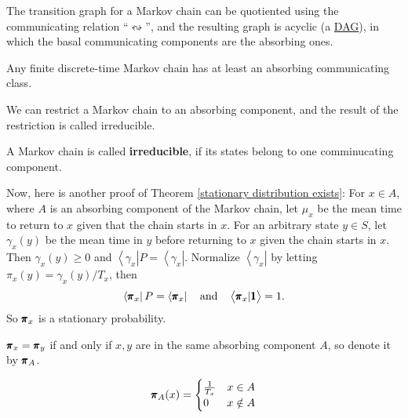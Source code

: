 \begin{remark}
    The transition graph for a Markov chain can be quotiented using the communicating relation ``$\leftrightsquigarrow$'', and the resulting graph is acyclic (a \href{https://en.wikipedia.org/wiki/Directed_acyclic_graph}{DAG}), in which the basal communicating components are the absorbing ones.
\end{remark}

\begin{proposition}
    Any finite discrete-time Markov chain has at least an absorbing communicating class. 
\end{proposition}

We can restrict a Markov chain to an absorbing component, and the result of the restriction is called irreducible.

\begin{definition}[Irreducibility]
    A Markov chain is called \textbf{irreducible}, if its states belong to one comminucating component.
\end{definition}

Now, here is another proof of Theorem \ref{stationary distribution exists}: For $x \in A$, where $A$ is an absorbing component of the Markov chain, let $\mu_x$ be the mean time to return to $x$ given that the chain starts in $x$. For an arbitrary state $y \in S$, let $\gamma_x(y)$ be the mean time in $y$ before returning to $x$ given the chain starts in $x$. Then $\gamma_x(y) \ge 0$ and $\left< \gamma_x \right| P = \left< \gamma_x \right|$. Normalize $\left< \gamma_x \right|$ by letting $\pi_x(y) = \gamma_x(y) / T_x$, then
\begin{equation*}
    \left< \pmb{\pi}_x \right| P = \left< \pmb{\pi}_x \right| \quad \text{and} \quad \left< \pmb{\pi}_x | \pmb{1} \right> = 1.
\end{equation*}
So $\pmb{\pi}_x$ is a stationary probability.

\begin{remark}
    $\pmb{\pi}_x = \pmb{\pi}_y$ if and only if $x, y$ are in the same absorbing component $A$, so denote it by $\pmb{\pi}_A$.
\end{remark}

\begin{remark}
    \begin{equation*}
        \pmb{\pi}_A(x) = \begin{cases}
            \frac{1}{T_x} & x \in A \\ 
            0  & x \notin A
        \end{cases}
    \end{equation*}
\end{remark}

